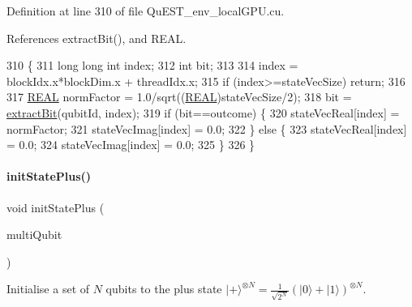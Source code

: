 Definition at line 310 of file Qu\+E\+S\+T\+\_\+env\+\_\+local\+G\+P\+U.\+cu.



References extract\+Bit(), and R\+E\+AL.


\begin{DoxyCode}
310                                                                                                            
                                     \{
311     \textcolor{keywordtype}{long} \textcolor{keywordtype}{long} \textcolor{keywordtype}{int} index;
312     \textcolor{keywordtype}{int} bit;
313 
314     index = blockIdx.x*blockDim.x + threadIdx.x;
315     \textcolor{keywordflow}{if} (index>=stateVecSize) \textcolor{keywordflow}{return};
316 
317     \mbox{\hyperlink{QuEST__precision_8h_a4b654506f18b8bfd61ad2a29a7e38c25}{REAL}} normFactor = 1.0/sqrt((\mbox{\hyperlink{QuEST__precision_8h_a4b654506f18b8bfd61ad2a29a7e38c25}{REAL}})stateVecSize/2);
318     bit = \mbox{\hyperlink{QuEST__env__localGPU_8cu_a6ffa51987d8ad8f6c0fc07fd3492277f}{extractBit}}(qubitId, index);
319     \textcolor{keywordflow}{if} (bit==outcome) \{
320         stateVecReal[index] = normFactor;
321         stateVecImag[index] = 0.0;
322     \} \textcolor{keywordflow}{else} \{
323         stateVecReal[index] = 0.0;
324         stateVecImag[index] = 0.0;
325     \}
326 \}
\end{DoxyCode}
\mbox{\label{QuEST__env__localGPU_8cu_af8a0082e2f695145bbfbb572e4c2e4f1}} 
\paragraph{\texorpdfstring{init\+State\+Plus()}{initStatePlus()}}
{\footnotesize\ttfamily void init\+State\+Plus (\begin{DoxyParamCaption}\item[{\mbox{\hyperlink{structMultiQubit}{Multi\+Qubit}}}]{multi\+Qubit }\end{DoxyParamCaption})}



Initialise a set of $ N $ qubits to the plus state $ {| + \rangle}^{\otimes N} = \frac{1}{\sqrt{2^N}} (| 0 \rangle + | 1 \rangle)^{\otimes N} $. 

